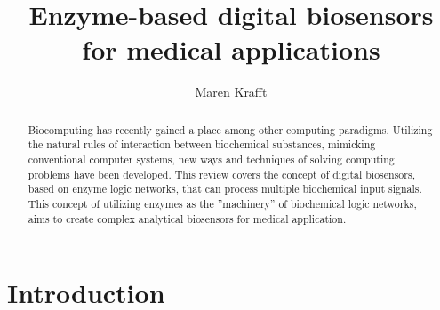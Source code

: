 \documentclass[runningheads]{llncs}
\begin{document}
\pagestyle{empty}
\title{Enzyme-based digital biosensors for medical applications}
\author{Maren Krafft}
\maketitle        

      
\begin{abstract}
Biocomputing has recently gained a place among other computing paradigms. Utilizing the natural rules of interaction between biochemical substances, mimicking conventional computer systems, new ways and techniques of solving computing problems have been developed. This review covers the concept of digital biosensors, based on enzyme logic networks, that can process multiple biochemical input signals. This concept of utilizing enzymes as the ''machinery'' of biochemical logic networks, aims to create complex analytical biosensors for medical application.


\end{abstract}


\section{Introduction}
\end{document}

